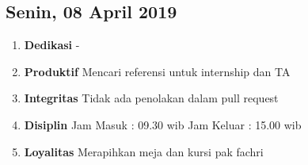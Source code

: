 \subsection{Senin, 08 April 2019}
\begin{enumerate}
\item \textbf{Dedikasi}
\subitem -
\item \textbf{Produktif}
\subitem Mencari referensi untuk internship dan TA
\item \textbf{Integritas}
\subitem Tidak ada penolakan dalam pull request
\item \textbf{Disiplin}
\subitem Jam Masuk : 09.30 wib
\subitem Jam Keluar : 15.00 wib
\item \textbf{Loyalitas}
\subitem Merapihkan meja dan kursi pak fachri
\end{enumerate}